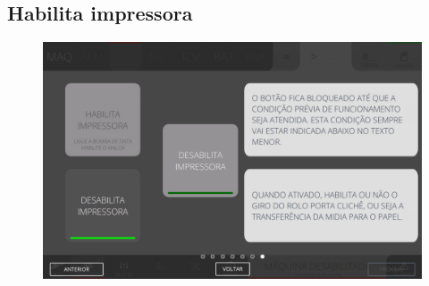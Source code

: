 \newpage
\thispagestyle{fancy}
\vspace{\fill}
\subsection{Habilita impressora}
\begin{figure}
    \centering
    \includegraphics[width=576 px,height=360 px]{src/imagesICV/04-printters/02-printter/commands/7.png}
\end{figure}
